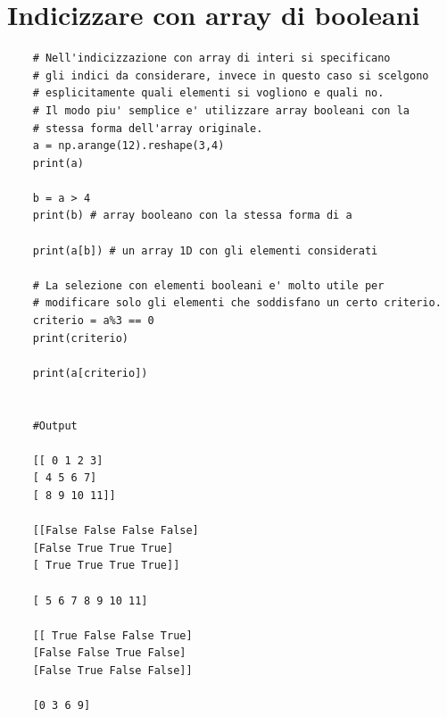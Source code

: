 \newpage

\section{Indicizzare con array di booleani}

\begin{lstlisting}
	# Nell'indicizzazione con array di interi si specificano
	# gli indici da considerare, invece in questo caso si scelgono
	# esplicitamente quali elementi si vogliono e quali no.
	# Il modo piu' semplice e' utilizzare array booleani con la
	# stessa forma dell'array originale.
	a = np.arange(12).reshape(3,4)
	print(a)
	
	b = a > 4
	print(b) # array booleano con la stessa forma di a
	
	print(a[b]) # un array 1D con gli elementi considerati
	
	# La selezione con elementi booleani e' molto utile per
	# modificare solo gli elementi che soddisfano un certo criterio.
	criterio = a%3 == 0
	print(criterio)
	
	print(a[criterio])

	
	#Output
	
	[[ 0 1 2 3]
	[ 4 5 6 7]
	[ 8 9 10 11]]

	[[False False False False]
	[False True True True]
	[ True True True True]]

	[ 5 6 7 8 9 10 11]

	[[ True False False True]
	[False False True False]
	[False True False False]]

	[0 3 6 9]
\end{lstlisting}